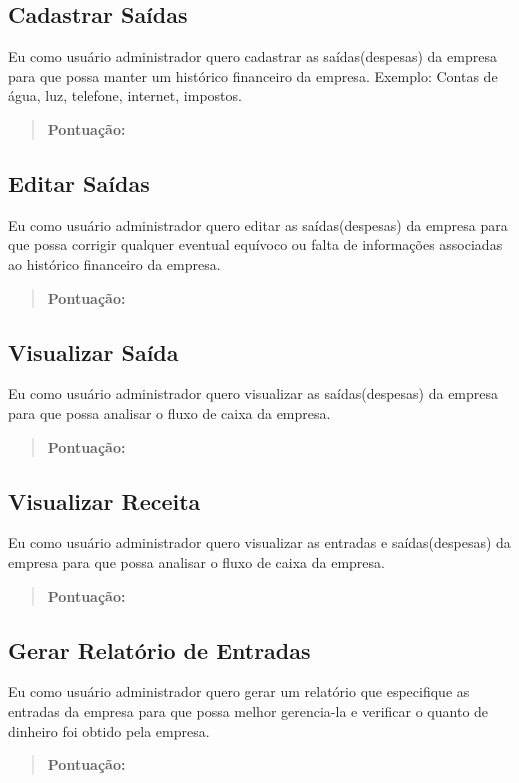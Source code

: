 \subsection[Cadastrar Saídas]{Cadastrar Saídas}
Eu como usuário administrador quero cadastrar as saídas(despesas) da empresa para que
possa manter um histórico financeiro da empresa.
Exemplo: Contas de água, luz, telefone, internet, impostos.
\begin{quote}
    \textbf{Pontuação:}
\end{quote}

\subsection[Editar Saídas]{Editar Saídas}
Eu como usuário administrador quero editar as saídas(despesas) da empresa para que possa
corrigir qualquer eventual equívoco ou falta de informações associadas ao
histórico financeiro da empresa.
\begin{quote}
    \textbf{Pontuação:}
\end{quote}

\subsection[Visualizar Saída]{Visualizar Saída}
Eu como usuário administrador quero visualizar as saídas(despesas) da empresa
para que possa analisar o fluxo de caixa da empresa.
\begin{quote}
    \textbf{Pontuação:}
\end{quote}

\subsection[Visualizar Receita]{Visualizar Receita}
Eu como usuário administrador quero visualizar as entradas e saídas(despesas) da empresa
para que possa analisar o fluxo de caixa da empresa.
\begin{quote}
    \textbf{Pontuação:}
\end{quote}

\subsection[Gerar Relatório de Entradas]{Gerar Relatório de Entradas}
Eu como usuário administrador quero gerar um relatório que especifique as
entradas da empresa para que possa melhor gerencia-la e verificar o quanto de
dinheiro foi obtido pela empresa.
\begin{quote}
    \textbf{Pontuação:}
\end{quote}

